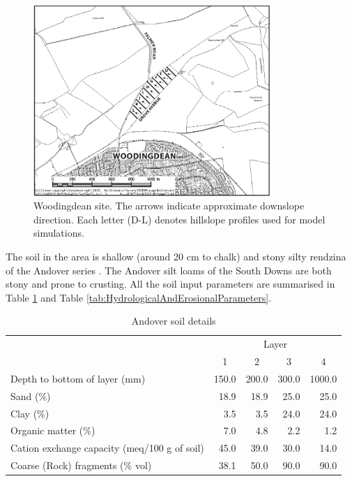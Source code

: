\begin{figure}[phtb]
  \centering
    \includegraphics[width=0.8\textwidth]{./img/woodingdean}
  \caption[Woodingdean site]{Woodingdean site. The arrows indicate
approximate downslope direction. Each letter (D-L) denotes hillslope profiles
used for model simulations.}
  \label{fig:WoodingdeanSite}
\end{figure}

The soil in the area is shallow (around 20 cm to chalk) and stony silty rendzina
of the Andover series \citep{jarvis1984-soils}. The Andover silt loams of the
South Downs are both stony and prone to crusting. All the soil input parameters
are summarised in Table \ref{tab:AndoverSoilDetails} and Table
\ref{tab:HydrologicalAndErosionalParameters}.

\begin{table}[htbp]
  \centering
  \caption[Andover soil details]{Andover soil details
\citep[From][]{favis-mortlock1998-141}}
  \label{tab:AndoverSoilDetails}
    \small
    \begin{tabular}{lrrrr}\toprule
    & \multicolumn{4}{c}{Layer}\\
    \cmidrule{2-5}
    & \multicolumn{1}{c}{1} & \multicolumn{1}{c}{2} &
\multicolumn{1}{c}{3} & \multicolumn{1}{c}{4}\\
    \midrule
    Depth to bottom of layer (mm) & 150.0 & 200.0 & 300.0 & 1000.0\\
    Sand (\%) & 18.9 & 18.9 & 25.0 & 25.0\\
    Clay (\%) & 3.5 & 3.5 & 24.0 & 24.0\\
    Organic matter (\%) & 7.0 & 4.8 & 2.2 & 1.2\\
    Cation exchange capacity (meq/100 g of soil) & 45.0 & 39.0 &
30.0 & 14.0\\
    Coarse (Rock) fragments (\% vol) & 38.1 & 50.0 & 90.0 & 90.0\\
    \bottomrule
    \end{tabular}
\end{table}

